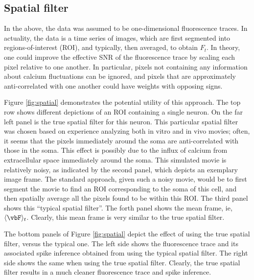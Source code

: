 \subsection{Spatial filter}

In the above, the data was assumed to be one-dimensional fluorescence traces.  In actuality, the data is a time series of images, which are first segmented into regions-of-interest (ROI), and typically, then averaged, to obtain $F_t$.  In theory, one could improve the effective SNR of the fluorescence trace by scaling each pixel relative to one another.  In particular, pixels not containing any information about calcium fluctuations can be ignored, and pixels that are approximately anti-correlated with one another could have weights with opposing signs.  

Figure \ref{fig:spatial} demonstrates the potential utility of this approach.  The top row shows different depictions of an ROI containing a single neuron.  On the far left panel is the true spatial filter for this neuron.  This particular spatial filter was chosen based on experience analyzing both in vitro and in vivo movies; often, it seems that the pixels immediately around the soma are anti-correlated with those in the soma.  This effect is possibly due to the influx of calcium from extracellular space immediately around the soma.  This simulated movie is relatively noisy, as indicated by the second panel, which depicts an exemplary image frame.  The standard approach, given such a noisy movie, would be to first segment the movie to find an ROI corresponding to the soma of this cell, and then spatially average all the pixels found to be within this ROI.  The third panel shows this ``typical spatial filter''.  The forth panel shows the mean frame, ie, $\langle \vbF \rangle_t$.  Clearly, this mean frame is very similar to the true spatial filter.

The bottom panels of Figure \ref{fig:spatial} depict the effect of using the true spatial filter, versus the typical one. The left side shows the fluorescence trace and its associated spike inference obtained from using the typical spatial filter.  The right side shows the same when using the true spatial filter.  Clearly, the true spatial filter results in a much cleaner fluorescence trace and spike inference.  


